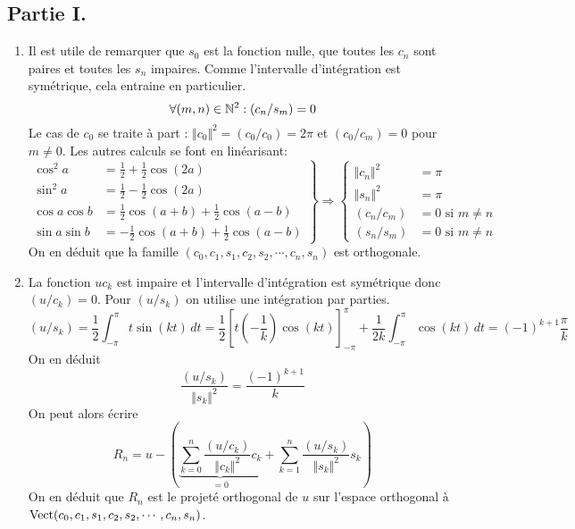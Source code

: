 \subsection*{Partie I.}
\begin{enumerate}
 \item Il est utile de remarquer que $s_0$ est la fonction nulle, que toutes les $c_n$ sont paires et toutes les $s_n$ impaires. Comme l'intervalle d'intégration est symétrique, cela entraine en particulier.
\begin{displaymath}
 \forall (m,n)\in \mathbb{N}^2: (c_n/s_m) = 0
\end{displaymath}
Le cas de $c_0$ se traite à part : $\Vert c_0\Vert^2=(c_0/c_0)=2\pi$ et $(c_0/c_m)=0$ pour $m\neq 0$.\newline
Les autres calculs se font en linéarisant:
\begin{displaymath}
 \left. 
\begin{aligned}
\cos^2a &=\frac{1}{2}+\frac{1}{2}\cos (2a)\\
\sin^2a &=\frac{1}{2}-\frac{1}{2}\cos (2a)\\
\cos a\cos b &= \frac{1}{2}\cos(a+b) + \frac{1}{2}\cos(a-b)\\
\sin a\sin b &= -\frac{1}{2}\cos(a+b) + \frac{1}{2}\cos(a-b)
\end{aligned}
\right\rbrace 
\Rightarrow
\left\lbrace 
\begin{aligned}
 \Vert c_n \Vert^2 &= \pi \\
 \Vert s_n \Vert^2 &= \pi \\
 (c_n/c_m) &=0 \text{ si } m\neq n\\
 (s_n/s_m) &=0 \text{ si } m\neq n
\end{aligned}
\right. 
\end{displaymath}
On en déduit que la famille $(c_0,c_1,s_1,c_2,s_2,\cdots,c_n,s_n)$ est orthogonale.
 \item La fonction $uc_k$ est impaire et l'intervalle d'intégration est symétrique donc $(u/c_k)=0$. Pour $(u/s_k)$ on utilise une intégration par parties.
\begin{displaymath}
 (u/s_k)=\frac{1}{2}\int_{-\pi}^\pi t\sin(kt)\,dt
=\frac{1}{2}\left[t(-\frac{1}{k})\cos(kt)\right]_{-\pi}^\pi+\frac{1}{2k}\int_{-\pi}^\pi\cos(kt)\,dt 
=(-1)^{k+1}\frac{\pi}{k}
\end{displaymath}
On en déduit
\begin{displaymath}
 \frac{(u/s_k)}{\Vert s_k\Vert^2} = \frac{(-1)^{k+1}}{k}
\end{displaymath}
On peut alors écrire
\begin{displaymath}
 R_n = u -\left( \underset{=0}{\underbrace{\sum_{k=0}^n\frac{(u/c_k)}{\Vert c_k\Vert^2}c_k}} 
+\sum_{k=1}^n\frac{(u/s_k)}{\Vert s_k\Vert^2}s_k\right) 
\end{displaymath}
On en déduit que $R_n$ est le projeté orthogonal de $u$ sur l'espace orthogonal à $\operatorname{Vect}(c_0,c_1,s_1,c_2,s_2,\cdots,c_n,s_n)$.
\end{enumerate}

